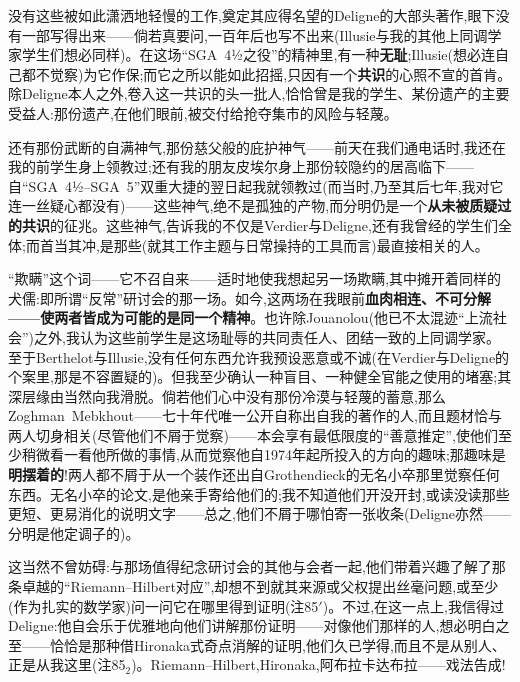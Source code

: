 没有这些被如此潇洒地轻慢的工作,奠定其应得名望的Deligne的大部头著作,眼下没有一部写得出来——倘若真要问,一百年后也写不出来(Illusie与我的其他上同调学家学生们想必同样)。在这场“SGA~4½之役”的精神里,有一种\textbf{无耻}\dmark{};Illusie(想必连自己都不觉察)为它作保;而它之所以能如此招摇,只因有一个\textbf{共识}的心照不宣的首肯。除Deligne本人之外,卷入这一共识的头一批人,恰恰曾是我的学生、某份遗产的主要受益人:那份遗产,在他们眼前,被交付给抢夺集市的风险与轻蔑。

还有那份武断的自满神气,那份慈父般的庇护神气——前天在我们通电话时,我还在我的前学生身上领教过;还有我的朋友皮埃尔身上那份较隐约的居高临下——自“SGA~4½--SGA~5”双重大捷的翌日起我就领教过(而当时,乃至其后七年,我对它连一丝疑心都没有)——这些神气,绝不是孤独的产物,而分明仍是一个\textbf{从未被质疑过的共识}的征兆。这些神气,告诉我的不仅是Verdier与Deligne,还有我曾经的学生们全体;而首当其冲,是那些(就其工作主题与日常操持的工具而言)最直接相关的人。

“欺瞒”这个词——它不召自来——适时地使我想起另一场欺瞒,其中摊开着同样的犬儒:即所谓“反常”研讨会的那一场。如今,这两场在我眼前\textbf{血肉相连、不可分解——使两者皆成为可能的是同一个精神}。也许除Jouanolou(他已不太混迹“上流社会”)之外,我认为这些前学生是这场耻辱的共同责任人、团结一致的上同调学家。至于Berthelot与Illusie,没有任何东西允许我预设恶意或不诚(在Verdier与Deligne的个案里,那是不容置疑的)。但我至少确认一种盲目、一种健全官能之使用的堵塞;其深层缘由当然向我滑脱。倘若他们心中没有那份冷漠与轻蔑的蓄意,那么Zoghman~Mebkhout——七十年代唯一公开自称出自我的著作的人,而且题材恰与两人切身相关(尽管他们不屑于觉察)——本会享有最低限度的“善意推定”,使他们至少稍微看一看他所做的事情,从而觉察他自1974年起所投入的方向的趣味;那趣味是\textbf{明摆着的}\dmark{}!两人都不屑于从一个装作还出自Grothendieck的无名小卒那里觉察任何东西。无名小卒的论文,是他亲手寄给他们的;我不知道他们开没开封,或读没读那些更短、更易消化的说明文字——总之,他们不屑于哪怕寄一张收条(Deligne亦然——分明是他定调子的)。

这当然不曾妨碍:与那场值得纪念研讨会的其他与会者一起,他们带着兴趣了解了那条卓越的“Riemann--Hilbert对应”,却想不到就其来源或父权提出丝毫问题,或至少(作为扎实的数学家)问一问它在哪里得到证明(注85$'$)。不过,在这一点上,我信得过Deligne:他自会乐于优雅地向他们讲解那份证明——对像他们那样的人,想必明白之至——恰恰是那种借Hironaka式奇点消解的证明,他们久已学得,而且不是从别人、正是从我这里(注85$_{2}$)。Riemann--Hilbert,Hironaka,阿布拉卡达布拉——戏法告成!

